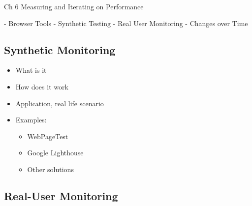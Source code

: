 







Ch 6 Measuring and Iterating on Performance

- Browser Tools
- Synthetic Testing
- Real User Monitoring
- Changes over Time















\subsection{Synthetic Monitoring}

\begin{itemize}
    \item What is it
    \item How does it work
    \item Application, real life scenario
    \item Examples:
    \begin{itemize}
        \item WebPageTest
        \item Google Lighthouse
        \item Other solutions
    \end{itemize}
\end{itemize}
















\subsection{Real-User Monitoring}

